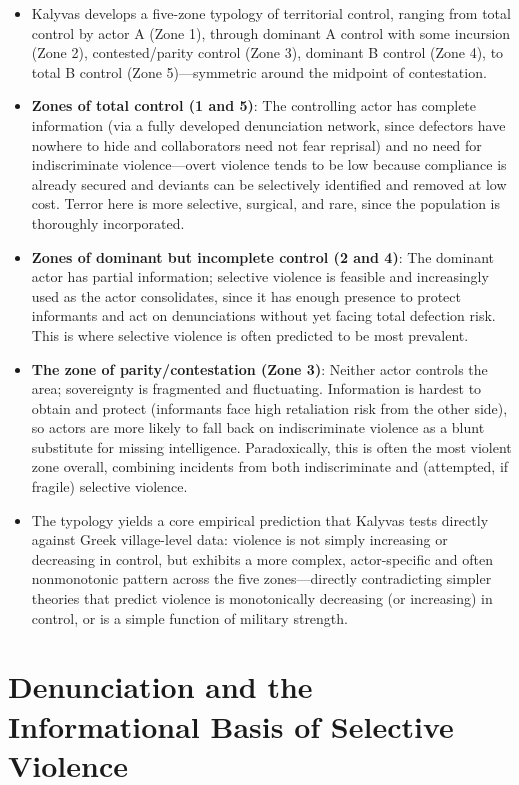 \documentclass[12pt]{article}
\begin{document}
\begin{itemize}[leftmargin=*, itemsep=4pt]
    \item Kalyvas develops a five-zone typology of territorial control, ranging from total control by actor A (Zone 1), through dominant A control with some incursion (Zone 2), contested/parity control (Zone 3), dominant B control (Zone 4), to total B control (Zone 5)---symmetric around the midpoint of contestation.
    \item \textbf{Zones of total control (1 and 5)}: The controlling actor has complete information (via a fully developed denunciation network, since defectors have nowhere to hide and collaborators need not fear reprisal) and no need for indiscriminate violence---overt violence tends to be low because compliance is already secured and deviants can be selectively identified and removed at low cost. Terror here is more selective, surgical, and rare, since the population is thoroughly incorporated.
    \item \textbf{Zones of dominant but incomplete control (2 and 4)}: The dominant actor has partial information; selective violence is feasible and increasingly used as the actor consolidates, since it has enough presence to protect informants and act on denunciations without yet facing total defection risk. This is where selective violence is often predicted to be most prevalent.
    \item \textbf{The zone of parity/contestation (Zone 3)}: Neither actor controls the area; sovereignty is fragmented and fluctuating. Information is hardest to obtain and protect (informants face high retaliation risk from the other side), so actors are more likely to fall back on indiscriminate violence as a blunt substitute for missing intelligence. Paradoxically, this is often the most violent zone overall, combining incidents from both indiscriminate and (attempted, if fragile) selective violence.
    \item The typology yields a core empirical prediction that Kalyvas tests directly against Greek village-level data: violence is not simply increasing or decreasing in control, but exhibits a more complex, actor-specific and often nonmonotonic pattern across the five zones---directly contradicting simpler theories that predict violence is monotonically decreasing (or increasing) in control, or is a simple function of military strength.
\end{itemize}

\section{Denunciation and the Informational Basis of Selective Violence}
\end{document}
